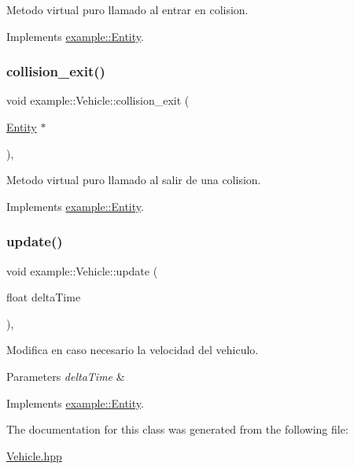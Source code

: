Metodo virtual puro llamado al entrar en colision. 



Implements \mbox{\hyperlink{classexample_1_1_entity_a09f6836192c2f8bce91a7b4f6934b94e}{example\+::\+Entity}}.

\mbox{\label{classexample_1_1_vehicle_ae8eeaa80a8a50a6402b313efca1dadba}} 
\subsubsection{\texorpdfstring{collision\_exit()}{collision\_exit()}}
{\footnotesize\ttfamily void example\+::\+Vehicle\+::collision\+\_\+exit (\begin{DoxyParamCaption}\item[{\mbox{\hyperlink{classexample_1_1_entity}{Entity}} $\ast$}]{ }\end{DoxyParamCaption})\hspace{0.3cm}{\ttfamily [override]}, {\ttfamily [virtual]}}



Metodo virtual puro llamado al salir de una colision. 



Implements \mbox{\hyperlink{classexample_1_1_entity_ae5d520b5f0dda6bb56a6c74eaf1c850c}{example\+::\+Entity}}.

\mbox{\label{classexample_1_1_vehicle_a6fcb41bf4274c7bbc1fb0957b770d65a}} 
\subsubsection{\texorpdfstring{update()}{update()}}
{\footnotesize\ttfamily void example\+::\+Vehicle\+::update (\begin{DoxyParamCaption}\item[{float}]{delta\+Time }\end{DoxyParamCaption})\hspace{0.3cm}{\ttfamily [override]}, {\ttfamily [virtual]}}



Modifica en caso necesario la velocidad del vehiculo. 


\begin{DoxyParams}{Parameters}
{\em delta\+Time} & \\
\hline
\end{DoxyParams}


Implements \mbox{\hyperlink{classexample_1_1_entity_a5dded5c361451f2cfdf7ed3c7de1194f}{example\+::\+Entity}}.



The documentation for this class was generated from the following file\+:\begin{DoxyCompactItemize}
\item 
\mbox{\hyperlink{_vehicle_8hpp}{Vehicle.\+hpp}}\end{DoxyCompactItemize}
